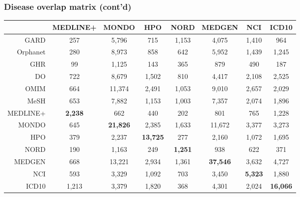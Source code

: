 ﻿\documentclass[anchorcolor=blue,linkcolor=blue]{beamer}
\begin{document}
\begin{frame}
  \frametitle{Disease overlap matrix (cont'd)}
  \begin{center}\tiny
    \begin{tabular}{rccccccc}\toprule
      & MEDLINE+&MONDO & HPO & NORD & MEDGEN & NCI & ICD10\\ \midrule
      GARD & 257&5,796&715&1,153&4,075 & 1,410 &964\\
      Orphanet &280&8,973&858 & 642& 5,952& 1,439 &1,245\\
      GHR &99 &1,125 &143 &365 &879 &490 &187\\
      DO &722 &8,679 &1,502 &810 &4,417 &2,108 &2,525\\
      OMIM &664 &11,374 &2,491 &1,053 &9,010 &2,657 &2,029\\
      MeSH &653 &7,882 &1,153 &1,003 &7,357 &2,074 &1,896\\
      MEDLINE+ &\textbf{2,238} &662 &440 &202 &801 &765 &1,228\\
      MONDO &645 &\textbf{21,826} &2,385 &1,633 &11,672 &3,377 &3,273\\
      HPO &379 &2,237 &\textbf{13,725} &277 &2,160 &1,072 &1,695\\
      NORD &190 &1,163 &249 &\textbf{1,251} &938 &622&371\\
      MEDGEN &668 &13,221 &2,934 &1,361&\textbf{37,546} &3,632 &4,727\\
      NCI &593 &3,329 &1,092 &703 &3,450&\textbf{5,323} &1,880\\
      ICD10 &1,213 & 3,379& 1,820& 368& 4,301& 2,024&\textbf{16,066}\\ \bottomrule
    \end{tabular}
  \end{center}
\end{frame}

\end{document}
